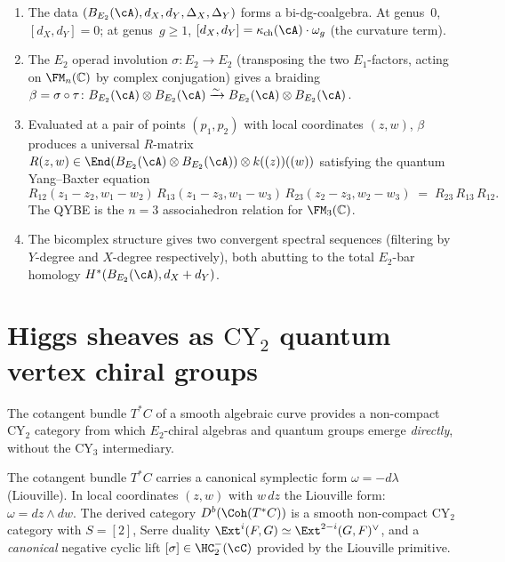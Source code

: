 \begin{proposition}
\label{prop:thy-e2-bicomplex-braiding}
\begin{enumerate}[label=(\roman*)]
\item The data $(B_{E_2}(\cA),d_X,d_Y,\Delta_X,\Delta_Y)$ forms a
bi-dg-coalgebra. At genus~$0$, $[d_X,d_Y]=0$; at genus~$g\geq 1$,
$[d_X,d_Y]=\kappa_{\mathrm{ch}}(\cA)\cdot\omega_g$ (the curvature term).

\item The $E_2$ operad involution $\sigma\colon E_2\to E_2$ (transposing
the two $E_1$-factors, acting on $\FM_n(\mathbb{C})$ by complex conjugation)
gives a braiding
$\beta=\sigma\circ\tau\colon B_{E_2}(\cA)\otimes B_{E_2}(\cA)
\xrightarrow{\sim}B_{E_2}(\cA)\otimes B_{E_2}(\cA)$.

\item Evaluated at a pair of points $(p_1,p_2)$ with local coordinates
$(z,w)$, $\beta$ produces a universal $R$-matrix $R(z,w)\in
\End(B_{E_2}(\cA)\otimes B_{E_2}(\cA))\otimes k((z))((w))$
satisfying the quantum Yang--Baxter equation
\[
R_{12}(z_1-z_2,w_1-w_2)\,R_{13}(z_1-z_3,w_1-w_3)\,R_{23}(z_2-z_3,w_2-w_3)
\;=\;R_{23}\,R_{13}\,R_{12}.
\]
The QYBE is the $n=3$ associahedron relation for $\FM_3(\mathbb{C})$.

\item The bicomplex structure gives two convergent spectral sequences
(filtering by $Y$-degree and $X$-degree respectively), both abutting
to the total $E_2$-bar homology $H^*(B_{E_2}(\cA),d_X+d_Y)$.
\end{enumerate}
\end{proposition}

\section{Higgs sheaves as \texorpdfstring{$\mathrm{CY}_2$}{CY-2} quantum vertex chiral groups}
\label{sec:thy-higgs-cy2-qvcg}

The cotangent bundle $T^*C$ of a smooth algebraic curve provides a
non-compact $\mathrm{CY}_2$ category from which $E_2$-chiral algebras and
quantum groups emerge \emph{directly}, without the $\mathrm{CY}_3$
intermediary.

\begin{proposition}
\label{prop:thy-higgs-cotangent-cy2}
The cotangent bundle $T^*C$ carries a canonical symplectic form
$\omega=-d\lambda$ (Liouville). In local coordinates $(z,w)$ with
$w\,dz$ the Liouville form: $\omega=dz\wedge dw$. The derived category
$D^b(\Coh(T^*C))$ is a smooth non-compact CY$_2$ category with
$S=[2]$, Serre duality $\Ext^i(F,G)\simeq\Ext^{2-i}(G,F)^\vee$, and a
\emph{canonical} negative cyclic lift $[\sigma]\in\HC_2^-(\cC)$ provided
by the Liouville primitive.
\end{proposition}

